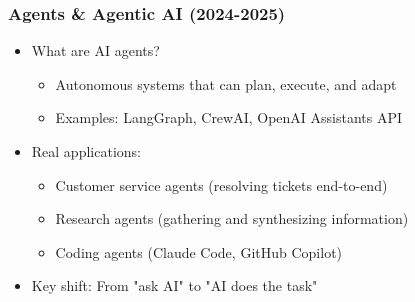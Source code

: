 
\begin{frame}[fragile]\frametitle{Agents \& Agentic AI (2024-2025)}

\begin{itemize}
\item What are AI agents?
	\begin{itemize}
	\item Autonomous systems that can plan, execute, and adapt
	\item Examples: LangGraph, CrewAI, OpenAI Assistants API
	\end{itemize}
\item Real applications:
	\begin{itemize}
	\item Customer service agents (resolving tickets end-to-end)
	\item Research agents (gathering and synthesizing information)
	\item Coding agents (Claude Code, GitHub Copilot)
	\end{itemize}
\item 	Key shift: From "ask AI" to "AI does the task"
\end{itemize}
\end{frame}

